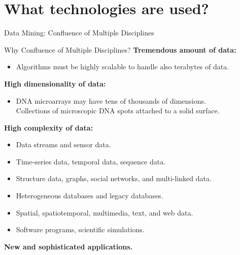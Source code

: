 \section{What technologies are used?}

\begin{frame}{Data Mining: Confluence of Multiple Disciplines}
	\centering
\end{frame}

\begin{frame}{Why Confluence of Multiple Disciplines?}
	\textbf{Tremendous amount of data:}
	\begin{itemize}
		\item Algorithms must be highly scalable to handle also terabytes of
		      data.
	\end{itemize}

	\textbf{High dimensionality of data:}
	\begin{itemize}
		\item DNA microarrays may have tens of thousands of dimensions.\\
		      Collections of microscopic DNA spots attached to a solid surface.
	\end{itemize}

	\textbf{High complexity of data:}
	\begin{itemize}
		\item Data streams and sensor data.
		\item Time-series data, temporal data, sequence data.
		\item Structure data, graphs, social networks, and multi-linked data.
		\item Heterogeneous databases and legacy databases.
		\item Spatial, spatiotemporal, multimedia, text, and web data.
		\item Software programs, scientific simulations.
	\end{itemize}
	\textbf{New and sophisticated applications.}
\end{frame}

